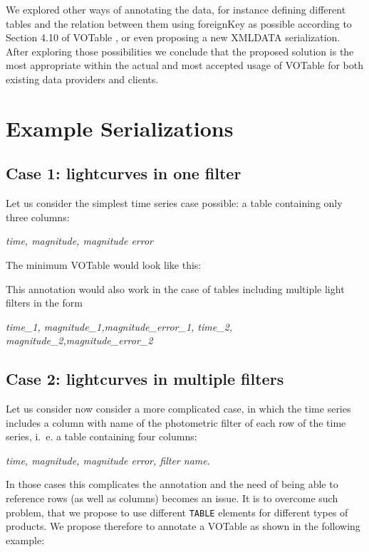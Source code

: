 \documentclass[11pt,a4paper]{ivoa} 
\let\fg=\color
\def\elem#1{{\tt{\fg{DarkRed}#1}}}
\begin{document}


We explored other ways of annotating the data, for instance defining
different tables and the relation between them using foreignKey as
possible according to Section 4.10 of VOTable
\citep{2019ivoa.spec.1021O}, or even proposing a new XMLDATA
serialization. After exploring those possibilities we conclude that
the proposed solution is the most appropriate within the actual and
most accepted usage of VOTable for both existing data providers and
clients.

\section{Example Serializations}
\subsection{Case 1: lightcurves in one filter}
Let us consider the simplest time series case possible: a table
containing only three columns:
\begin{center}
   \emph{time, magnitude, magnitude error}
\end{center}

The minimum VOTable would look like this:



This annotation would also work in the case of tables including
multiple light filters in the form
\begin{center}
   \emph{time\_1, magnitude\_1,magnitude\_error\_1, time\_2,
     magnitude\_2,magnitude\_error\_2}
\end{center}

\subsection{Case 2: lightcurves in multiple filters}
Let us consider now consider a more complicated case, in which the
time series includes a column with name of the photometric filter of
each row of the time series, i.~e. a table containing four columns:
\begin{center}
   \emph{time, magnitude, magnitude error, filter name}.
\end{center}
In those cases this complicates the annotation and the need of being
able to reference rows (as well as columns) becomes an issue. It is to
overcome such problem, that we propose to use different \elem{TABLE}
elements for different types of products. We propose therefore to
annotate a VOTable as shown in the following example:
\end{document}
